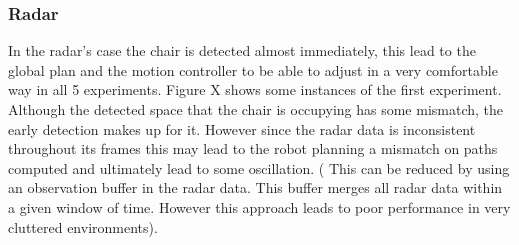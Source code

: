 \subsubsection{Radar}
In the radar's case the chair is detected almost immediately, this lead to the global plan and the motion controller to be able to adjust in a very comfortable way in all 5 experiments. Figure X shows some instances of the first experiment. Although the detected space that the chair is occupying has some mismatch, the early detection makes up for it. However since the radar data is inconsistent throughout its frames this may lead to the robot planning a mismatch on paths computed and ultimately lead to some oscillation. ( This can be reduced by using an observation buffer in the radar data. This buffer merges all radar data within a given window of time. However this approach leads to poor performance in very cluttered environments).
